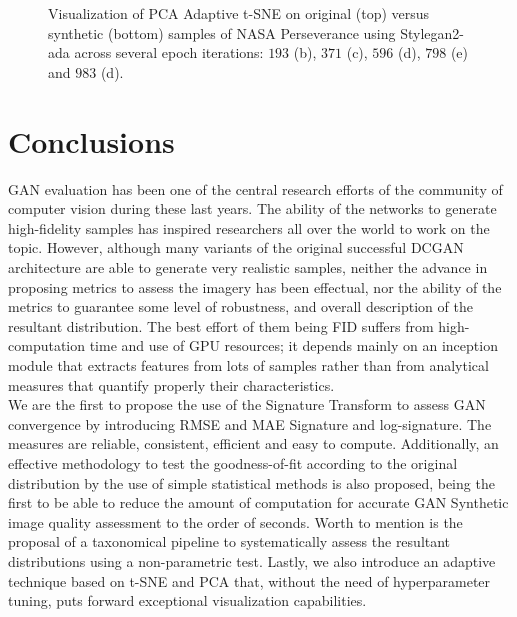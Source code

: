 \documentclass[lettersize,journal]{IEEEtran}
\begin{document}
\begin{figure}[ht]
\centering
{}\\
\\
\caption{Visualization of PCA Adaptive t-SNE on original (top) versus synthetic (bottom) samples of NASA Perseverance using Stylegan2-ada across several epoch iterations: $193$ (b), $371$ (c), $596$ (d), $798$ (e) and $983$ (d).}
\label{fge:b_3_decurto_and_dezarza}
\end{figure}

\section{Conclusions}
\label{sn:conclusions}

GAN evaluation has been one of the central research efforts of the community of computer vision during these last years. The ability of the networks to generate high-fidelity samples has inspired researchers all over the world to work on the topic. However, although many variants of the original successful DCGAN architecture are able to generate very realistic samples, neither the advance in proposing metrics to assess the imagery has been effectual, nor the ability of the metrics to guarantee some level of robustness, and overall description of the resultant distribution. The best effort of them being FID suffers from high-computation time and use of GPU resources; it depends mainly on an inception module that extracts features from lots of samples rather than from analytical measures that quantify properly their characteristics.  
\\

We are the first to propose the use of the Signature Transform to assess GAN convergence by introducing RMSE and MAE Signature and log-signature. The measures are reliable, consistent, efficient and easy to compute. Additionally, an effective methodology to test the goodness-of-fit according to the original distribution by the use of simple statistical methods is also proposed, being the first to be able to reduce the amount of computation for accurate GAN Synthetic image quality assessment to the order of seconds. Worth to mention is the proposal of a taxonomical pipeline to systematically assess the resultant distributions using a non-parametric test. Lastly, we also introduce an adaptive technique based on t-SNE and PCA that, without the need of hyperparameter tuning, puts forward exceptional visualization capabilities.
\\
\end{document}
